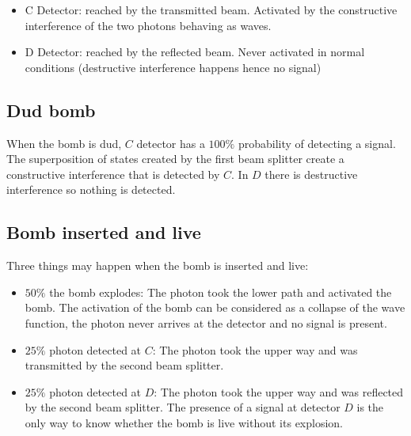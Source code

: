 \begin{multicols}{2}
	\begin{itemize}
		\item C Detector: reached by the transmitted beam.
	Activated by the constructive interference of the two photons behaving as waves.
		\item D Detector: reached by the reflected beam.
	Never activated in normal conditions (destructive interference happens hence no signal)
	\end{itemize}
\end{multicols}

	\subsection{Dud bomb}
	When the bomb is dud, $C$ detector has a $100\%$ probability of detecting a signal.
	The superposition of states created by the first beam splitter create a constructive interference that is detected by $C$.
	In $D$ there is destructive interference so nothing is detected.

	\subsection{Bomb inserted and live}
	Three things may happen when the bomb is inserted and live:

	\begin{multicols}{2}
		\begin{itemize}
			\item $50\%$ the bomb explodes: The photon took the lower path and activated the bomb.
				The activation of the bomb can be considered as a collapse of the wave function, the photon never arrives at the detector and no signal is present.
			\item $25\%$ photon detected at $C$: The photon took the upper way and was transmitted by the second beam splitter.
			\item $25\%$ photon detected at $D$: The photon took the upper way and was reflected by the second beam splitter.
				The presence of a signal at detector $D$ is the only way to know whether the bomb is live without its explosion.
		\end{itemize}
	\end{multicols}
